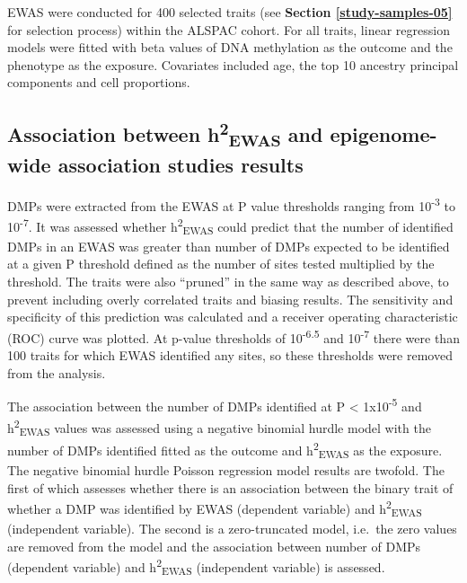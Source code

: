 \documentclass[11pt,oneside]{bristolthesis}
\begin{document}
EWAS were conducted for 400 selected traits (see \textbf{Section \ref{study-samples-05}} for selection process) within the ALSPAC cohort. For all traits, linear regression models were fitted with beta values of DNA methylation as the outcome and the phenotype as the exposure. Covariates included age, the top 10 ancestry principal components and cell proportions.

\hypertarget{methods-h2ewas-dmp}{%
\subsection{\texorpdfstring{Association between h\textsuperscript{2}\textsubscript{EWAS} and epigenome-wide association studies results}{Association between h2EWAS and epigenome-wide association studies results}}\label{methods-h2ewas-dmp}}

DMPs were extracted from the EWAS at P value thresholds ranging from 10\textsuperscript{-3} to 10\textsuperscript{-7}. It was assessed whether h\textsuperscript{2}\textsubscript{EWAS} could predict that the number of identified DMPs in an EWAS was greater than number of DMPs expected to be identified at a given P threshold defined as the number of sites tested multiplied by the threshold. The traits were also ``pruned'' in the same way as described above, to prevent including overly correlated traits and biasing results. The sensitivity and specificity of this prediction was calculated and a receiver operating characteristic (ROC) curve was plotted. At p-value thresholds of 10\textsuperscript{-6.5} and 10\textsuperscript{-7} there were than 100 traits for which EWAS identified any sites, so these thresholds were removed from the analysis.

The association between the number of DMPs identified at P \textless{} 1x10\textsuperscript{-5} and h\textsuperscript{2}\textsubscript{EWAS} values was assessed using a negative binomial hurdle model with the number of DMPs identified fitted as the outcome and h\textsuperscript{2}\textsubscript{EWAS} as the exposure. The negative binomial hurdle Poisson regression model results are twofold. The first of which assesses whether there is an association between the binary trait of whether a DMP was identified by EWAS (dependent variable) and h\textsuperscript{2}\textsubscript{EWAS} (independent variable). The second is a zero-truncated model, i.e.~the zero values are removed from the model and the association between number of DMPs (dependent variable) and h\textsuperscript{2}\textsubscript{EWAS} (independent variable) is assessed.
\end{document}
